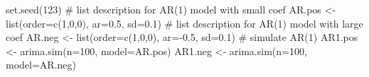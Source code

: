 \begin{Schunk}
\begin{Sinput}
 set.seed(123)
 # list description for AR(1) model with small coef
 AR.pos <- list(order=c(1,0,0), ar=0.5, sd=0.1)
 # list description for AR(1) model with large coef
 AR.neg <- list(order=c(1,0,0), ar=-0.5, sd=0.1)
 # simulate AR(1)
 AR1.pos <- arima.sim(n=100, model=AR.pos)
 AR1.neg <- arima.sim(n=100, model=AR.neg)
\end{Sinput}
\end{Schunk}
